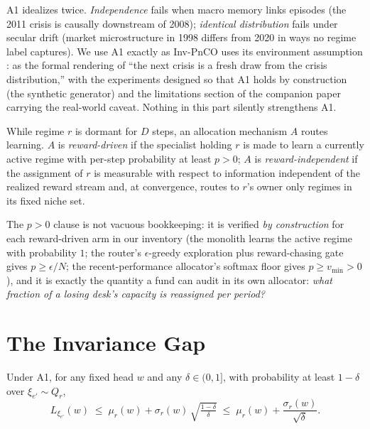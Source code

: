\begin{warning}
A1 idealizes twice. \emph{Independence} fails when macro memory links
episodes (the 2011 crisis is causally downstream of 2008); \emph{identical
distribution} fails under secular drift (market microstructure in 1998
differs from 2020 in ways no regime label captures). We use A1 exactly as
Inv-PnCO uses its environment assumption \cite{yan2026invpnco}: as the
formal rendering of ``the next crisis is a fresh draw from the crisis
distribution,'' with the experiments designed so that A1 holds by
construction (the synthetic generator) and the limitations section of the
companion paper carrying the real-world caveat. Nothing in this part
silently strengthens A1.
\end{warning}

\begin{definition}
\label{def:dd4-a2}
While regime $r$ is dormant for $D$ steps, an allocation mechanism $A$
routes learning. $A$ is \emph{reward-driven} if the specialist holding
$r$ is made to learn a currently active regime with per-step probability
at least $p > 0$; $A$ is \emph{reward-independent} if the assignment of
$r$ is measurable with respect to information independent of the
realized reward stream and, at convergence, routes to $r$'s owner only
regimes in its fixed niche set.
\end{definition}

The $p > 0$ clause is not vacuous bookkeeping: it is verified \emph{by
construction} for each reward-driven arm in our inventory (the monolith
learns the active regime with probability $1$; the router's
$\epsilon$-greedy exploration plus reward-chasing gate gives
$p \ge \epsilon / N$; the recent-performance allocator's softmax floor
gives $p \ge v_{\min} > 0$), and it is exactly the quantity a fund can
audit in its own allocator: \emph{what fraction of a losing desk's
capacity is reassigned per period?}

\section{The Invariance Gap}
\label{sec:dd4-invgap}

\begin{lemma}
\label{lem:dd4-transfer}
Under A1, for any fixed head $w$ and any $\delta \in (0, 1]$, with
probability at least $1 - \delta$ over $\xi_{e'} \sim Q_r$,
\[
  L_{\xi_{e'}}(w) \;\le\; \mu_r(w) +
  \sigma_r(w)\,\sqrt{\tfrac{1-\delta}{\delta}}
  \;\le\; \mu_r(w) + \frac{\sigma_r(w)}{\sqrt{\delta}} .
\]
\end{lemma}

